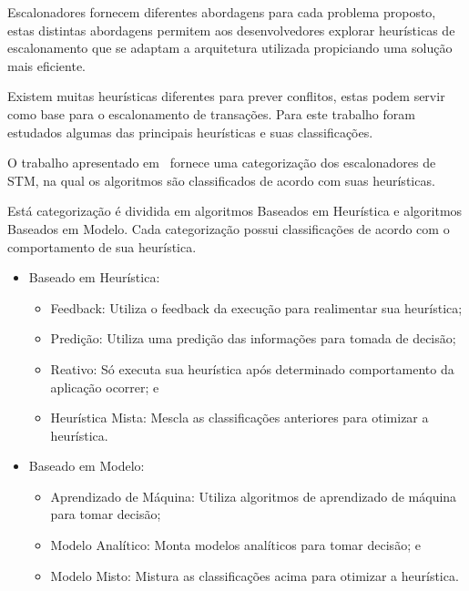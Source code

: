 \documentclass[diss,capa]{texufpel}
\begin{document}

Escalonadores fornecem diferentes abordagens para cada problema proposto, estas distintas abordagens permitem aos desenvolvedores explorar heurísticas de escalonamento que se adaptam a arquitetura utilizada propiciando uma solução mais eficiente.

Existem muitas heurísticas diferentes para prever conflitos, estas podem servir como base para o escalonamento de transações. Para este trabalho foram estudados algumas das principais heurísticas e suas classificações.

O trabalho apresentado em~\cite{disanzo2017} fornece uma categorização dos escalonadores de STM, na qual os algoritmos são classificados de acordo com suas heurísticas.

Está categorização é dividida em algoritmos Baseados em Heurística e algoritmos Baseados em Modelo. Cada categorização possui classificações de acordo com o comportamento de sua heurística.

\begin{itemize}
 \item Baseado em Heurística:
 \begin{itemize}
     \item Feedback: Utiliza o feedback da execução para realimentar sua heurística;
     \item Predição: Utiliza uma predição das informações para tomada de decisão;
     \item Reativo: Só executa sua heurística após determinado comportamento da aplicação ocorrer; e
     \item Heurística Mista: Mescla as classificações anteriores para otimizar a heurística.
 \end{itemize}
 \item Baseado em Modelo:
 \begin{itemize}
     \item Aprendizado de Máquina: Utiliza algoritmos de aprendizado de máquina para tomar decisão;
     \item Modelo Analítico: Monta modelos analíticos para tomar decisão; e
     \item Modelo Misto: Mistura as classificações acima para otimizar a heurística.
 \end{itemize}
\end{itemize}
\end{document}
